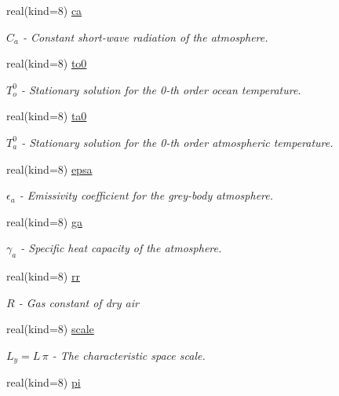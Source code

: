 \begin{DoxyCompactItemize}
real(kind=8) \hyperlink{classparams_a39788da6872d45cd235d734a6f60ac20}{ca}
\begin{DoxyCompactList}\small\item\em $C_a$ -\/ Constant short-\/wave radiation of the atmosphere. \end{DoxyCompactList}\item 
real(kind=8) \hyperlink{classparams_ad880ab6d5fab6c7a095b526383e75404}{to0}
\begin{DoxyCompactList}\small\item\em $T_o^0$ -\/ Stationary solution for the 0-\/th order ocean temperature. \end{DoxyCompactList}\item 
real(kind=8) \hyperlink{classparams_af3fdd8c130a667bca95de5ebf9e5f492}{ta0}
\begin{DoxyCompactList}\small\item\em $T_a^0$ -\/ Stationary solution for the 0-\/th order atmospheric temperature. \end{DoxyCompactList}\item 
real(kind=8) \hyperlink{classparams_a10c96506a7d395bb9b15734461aef879}{epsa}
\begin{DoxyCompactList}\small\item\em $\epsilon_a$ -\/ Emissivity coefficient for the grey-\/body atmosphere. \end{DoxyCompactList}\item 
real(kind=8) \hyperlink{classparams_a1c769c8719a62f1a72837b7b9daf8024}{ga}
\begin{DoxyCompactList}\small\item\em $\gamma_a$ -\/ Specific heat capacity of the atmosphere. \end{DoxyCompactList}\item 
real(kind=8) \hyperlink{classparams_ac1c1ed1ab5fcbdbd6a77b8a5c69fc6e5}{rr}
\begin{DoxyCompactList}\small\item\em $R$ -\/ Gas constant of dry air \end{DoxyCompactList}\item 
real(kind=8) \hyperlink{classparams_a7803126847c2e1b2b4aced941ec9257b}{scale}
\begin{DoxyCompactList}\small\item\em $L_y = L \, \pi$ -\/ The characteristic space scale. \end{DoxyCompactList}\item 
real(kind=8) \hyperlink{classparams_aaed8cf35d6e94ec5a9aeab80125e470f}{pi}

\end{DoxyCompactItemize}
